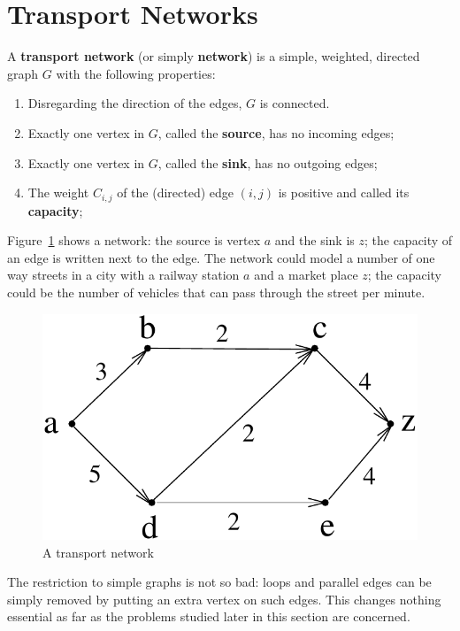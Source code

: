 \section{Transport Networks}

 \begin{definition} {\rm A \textbf{transport
         network} (or simply \textbf{network}) is a simple, weighted,
        directed graph $G$ with the following properties:\label{transportnetwork}
	\begin{enumerate}
		\item Disregarding the direction of the edges, $G$ is connected.		
		\item Exactly one vertex in $G$, called the \textbf{source}, has no incoming edges;
		\item Exactly one vertex in $G$, called the \textbf{sink}, has no outgoing edges;
		\item The weight $C_{i,j}$ of the (directed) edge $(i,j)$ is positive and called its \textbf{capacity};\footnotemark
	\end{enumerate}
}
\end{definition}

Figure~\ref{transport1} shows a network: the source is vertex $a$ and
the sink is $z$; the capacity of an edge is written next to the
edge. The network could model a number of one way streets in a city
with a railway station $a$ and a market place $z$; the capacity could
be the number of vehicles that can pass through the street per minute.

\begin{figure}[ht]
	\centering
	\includegraphics[width=0.3\linewidth,keepaspectratio]{transport1} %
	\caption{A transport network \label{transport1}}
\end{figure}

The restriction to simple graphs is not so bad: loops and parallel
edges can be simply removed by putting an extra vertex on such
edges. This changes nothing essential as far as the problems studied
later in this section are concerned.


